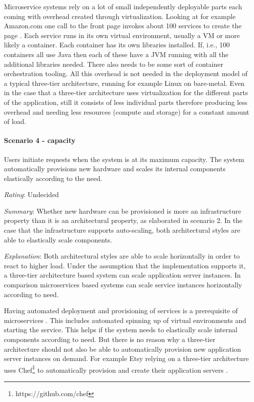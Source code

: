 Microservice systems rely on a lot of small independently deployable parts each coming with overhead created through virtualization. 
Looking at for example Amazon.com one call to the front page invokes about 100 services to create the page \citep{Vogels2006}. 
Each service runs in its own virtual environment, usually a \ac{VM} or more likely a container.
Each container has its own libraries installed. 
If, i.e., 100 containers all use Java then each of these have a JVM running with all the additional libraries needed.
There also needs to be some sort of container orchestration tooling.
All this overhead is not needed in the deployment model of a typical three-tier architecture, running for example Linux on bare-metal.
Even in the case that a three-tier architecture uses virtualization for the different parts of the application, still it consists of less individual parts therefore producing less overhead and needing less resources (compute and storage) for a constant amount of load.

\paragraph{Scenario 4 - capacity} Users initiate requests when the system is at its maximum capacity. The system automatically provisions new hardware and scales its internal components elastically according to the need.	
\label{quaMicro:s4}

\textit{Rating}: Undecided

\textit{Summary}:
Whether new hardware can be provisioned is more an infrastructure property than it is an architectural property, as elaborated in scenario 2.
In the case that the infrastructure supports auto-scaling, both architectural styles are able to elastically scale components.

\textit{Explanation}:
Both architectural styles are able to scale horizontally in order to react to higher load.
Under the assumption that the implementation supports it, a three-tier architecture based system can scale application server instances.
In comparison microservices based systems can scale service instances horizontally according to need.

Having automated deployment and provisioning of services is a prerequisite of microservices \cite{FowlerPrerequisites2014}. 
This includes automated spinning up of virtual environments and starting the service.
This helps if the system needs to elastically scale internal components according to need.
But there is no reason why a three-tier architecture should not also be able to automatically provision new application server instances on demand.
For example Etsy relying on a three-tier architecture uses Chef\footnote{https://github.com/chef} to automatically provision and create their application servers \cite{Etsy2014}.

